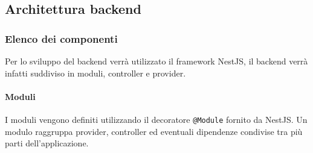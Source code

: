 \subsection{Architettura backend}
\subsubsection{Elenco dei componenti}
Per lo sviluppo del backend verrà utilizzato il framework NestJS, il backend verrà infatti suddiviso in moduli, controller e provider.

\paragraph{Moduli}
I moduli vengono definiti utilizzando il decoratore \texttt{@Module} fornito da NestJS.
Un modulo raggruppa provider, controller ed eventuali dipendenze condivise tra più parti dell'applicazione.
